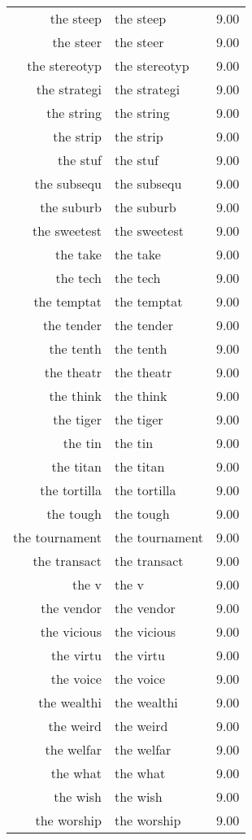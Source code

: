 \begin{table}[ht]
\begin{tabular}{rlr}
  the steep & the steep & 9.00 \\ 
  the steer & the steer & 9.00 \\ 
  the stereotyp & the stereotyp & 9.00 \\ 
  the strategi & the strategi & 9.00 \\ 
  the string & the string & 9.00 \\ 
  the strip & the strip & 9.00 \\ 
  the stuf & the stuf & 9.00 \\ 
  the subsequ & the subsequ & 9.00 \\ 
  the suburb & the suburb & 9.00 \\ 
  the sweetest & the sweetest & 9.00 \\ 
  the take & the take & 9.00 \\ 
  the tech & the tech & 9.00 \\ 
  the temptat & the temptat & 9.00 \\ 
  the tender & the tender & 9.00 \\ 
  the tenth & the tenth & 9.00 \\ 
  the theatr & the theatr & 9.00 \\ 
  the think & the think & 9.00 \\ 
  the tiger & the tiger & 9.00 \\ 
  the tin & the tin & 9.00 \\ 
  the titan & the titan & 9.00 \\ 
  the tortilla & the tortilla & 9.00 \\ 
  the tough & the tough & 9.00 \\ 
  the tournament & the tournament & 9.00 \\ 
  the transact & the transact & 9.00 \\ 
  the v & the v & 9.00 \\ 
  the vendor & the vendor & 9.00 \\ 
  the vicious & the vicious & 9.00 \\ 
  the virtu & the virtu & 9.00 \\ 
  the voice & the voice & 9.00 \\ 
  the wealthi & the wealthi & 9.00 \\ 
  the weird & the weird & 9.00 \\ 
  the welfar & the welfar & 9.00 \\ 
  the what & the what & 9.00 \\ 
  the wish & the wish & 9.00 \\ 
  the worship & the worship & 9.00 \\ 

\end{tabular}
\end{table}
